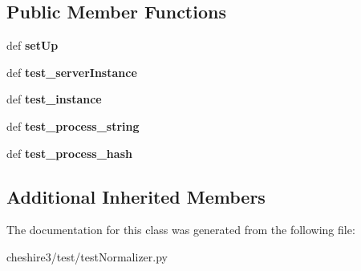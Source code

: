 \subsection*{Public Member Functions}
\begin{DoxyCompactItemize}
\item 
\hypertarget{classcheshire3_1_1test_1_1test_normalizer_1_1_unicode_collation_normalizer_test_case_afd9356bed38029b918a6700a3bf3d9bf}{def {\bfseries set\-Up}}\label{classcheshire3_1_1test_1_1test_normalizer_1_1_unicode_collation_normalizer_test_case_afd9356bed38029b918a6700a3bf3d9bf}

\item 
\hypertarget{classcheshire3_1_1test_1_1test_normalizer_1_1_unicode_collation_normalizer_test_case_a6210098320d264fc25bb4cd345496dd5}{def {\bfseries test\-\_\-server\-Instance}}\label{classcheshire3_1_1test_1_1test_normalizer_1_1_unicode_collation_normalizer_test_case_a6210098320d264fc25bb4cd345496dd5}

\item 
\hypertarget{classcheshire3_1_1test_1_1test_normalizer_1_1_unicode_collation_normalizer_test_case_af96fa412e0807fcc1a520181e1ffc680}{def {\bfseries test\-\_\-instance}}\label{classcheshire3_1_1test_1_1test_normalizer_1_1_unicode_collation_normalizer_test_case_af96fa412e0807fcc1a520181e1ffc680}

\item 
\hypertarget{classcheshire3_1_1test_1_1test_normalizer_1_1_unicode_collation_normalizer_test_case_a2fb7201b86cd7c7bb1488b30d176d53c}{def {\bfseries test\-\_\-process\-\_\-string}}\label{classcheshire3_1_1test_1_1test_normalizer_1_1_unicode_collation_normalizer_test_case_a2fb7201b86cd7c7bb1488b30d176d53c}

\item 
\hypertarget{classcheshire3_1_1test_1_1test_normalizer_1_1_unicode_collation_normalizer_test_case_ab6cc330bea0f6a6170b6c9cb7255bd8d}{def {\bfseries test\-\_\-process\-\_\-hash}}\label{classcheshire3_1_1test_1_1test_normalizer_1_1_unicode_collation_normalizer_test_case_ab6cc330bea0f6a6170b6c9cb7255bd8d}

\end{DoxyCompactItemize}
\subsection*{Additional Inherited Members}


The documentation for this class was generated from the following file\-:\begin{DoxyCompactItemize}
\item 
cheshire3/test/test\-Normalizer.\-py\end{DoxyCompactItemize}

